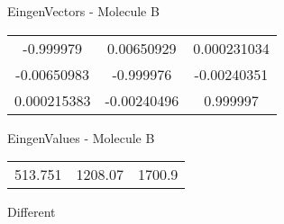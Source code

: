 \begin{multicols}{2}
\begin{center}
\vtab
 EingenVectors - Molecule B     \\
\vtab
\begin{tabular}{|c c c|}
-0.999979	 & 	0.00650929	 & 	0.000231034	 \\
-0.00650983	 & 	-0.999976	 & 	-0.00240351	 \\
0.000215383	 & 	-0.00240496	 & 	0.999997
\end{tabular}

\vtab
 EingenValues - Molecule B     \\
\vtab
\begin{tabular}{|c c c|}
513.751	 & 	1208.07	 & 	1700.9	 \\
\end{tabular}

\end{center}
\end{multicols}
\begin{center}
\vtab
\vtab
\textcolor{NavyBlue}{\Large Different}
\end{center}

 \newpage

